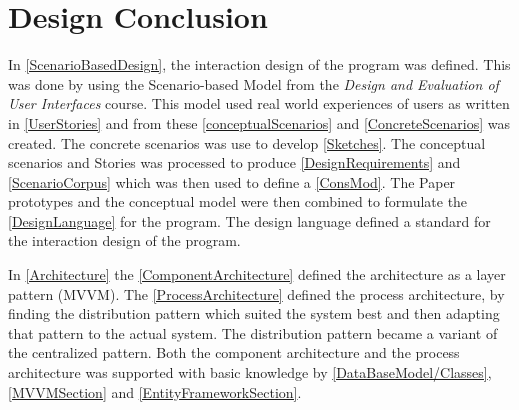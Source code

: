 \chapter{Design Conclusion}
In  \cref{ScenarioBasedDesign}, the interaction design of the program was defined. This was done by using the Scenario-based Model from the \textit{Design and Evaluation of User Interfaces} course. This model used real world experiences of users as  written in \cref{UserStories} and from these  \cref{conceptualScenarios} and  \cref{ConcreteScenarios} was created. The concrete scenarios was use to develop  \cref{Sketches}. The conceptual scenarios and Stories was processed to produce  \cref{DesignRequirements} and  \cref{ScenarioCorpus} which was then used to define a  \cref{ConsMod}. The Paper prototypes and the conceptual model were then combined to formulate the  \cref{DesignLanguage} for the program. The design language defined a standard for the interaction design of the program.  

In  \cref{Architecture} the  \cref{ComponentArchitecture} defined the architecture as a layer pattern (MVVM). The  \cref{ProcessArchitecture} defined the process architecture, by finding the distribution pattern which suited the system best and then adapting that pattern to the actual system. The distribution pattern became a variant of the centralized pattern. Both the component architecture and the process architecture was supported with basic knowledge by \cref{DataBaseModel/Classes}, \cref{MVVMSection} and \cref{EntityFrameworkSection}.   
